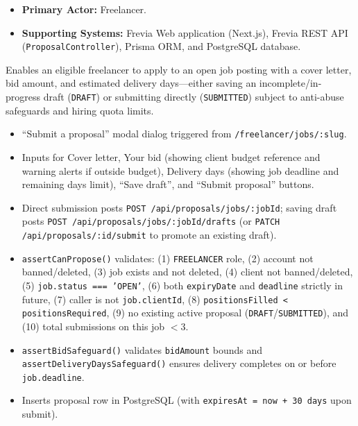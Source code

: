 
\begin{itemize}[leftmargin=1.6em,topsep=3pt,itemsep=2pt,parsep=0pt,label=$\bullet$]
    \item \textbf{Primary Actor:} Freelancer.
    \item \textbf{Supporting Systems:} Frevia Web application (Next.js), Frevia REST API (\texttt{ProposalController}), Prisma ORM, and PostgreSQL database.
\end{itemize}

\noindent Enables an eligible freelancer to apply to an open job posting with a cover letter, bid amount, and estimated delivery days—either saving an incomplete/in-progress draft (\texttt{DRAFT}) or submitting directly (\texttt{SUBMITTED}) subject to anti-abuse safeguards and hiring quota limits.

\begin{itemize}[leftmargin=1.6em,topsep=3pt,itemsep=2pt,parsep=0pt,label=$\bullet$]
    \item ``Submit a proposal'' modal dialog triggered from \texttt{/freelancer/jobs/:slug}.
    \item Inputs for Cover letter, Your bid (showing client budget reference and warning alerts if outside budget), Delivery days (showing job deadline and remaining days limit), ``Save draft'', and ``Submit proposal'' buttons.
\end{itemize}

\begin{itemize}[leftmargin=1.6em,topsep=3pt,itemsep=2pt,parsep=0pt,label=$\bullet$]
    \item Direct submission posts \texttt{POST /api/proposals/jobs/:jobId}; saving draft posts \texttt{POST /api/proposals/jobs/:jobId/drafts} (or \texttt{PATCH /api/proposals/:id/submit} to promote an existing draft).
    \item \texttt{assert\allowbreak{}Can\allowbreak{}Propose()} validates: (1) \texttt{FREELANCER} role, (2) account not banned/deleted, (3) job exists and not deleted, (4) client not banned/deleted, (5) \texttt{job.\allowbreak{}status =\allowbreak{}=\allowbreak{}= 'OPEN'}, (6) both \texttt{expiryDate} and \texttt{deadline} strictly in future, (7) caller is not \texttt{job.\allowbreak{}clientId}, (8) \texttt{positions\allowbreak{}Filled < positions\allowbreak{}Required}, (9) no existing active proposal (\texttt{DRAFT}/\texttt{SUBMITTED}), and (10) total submissions on this job $< 3$.
    \item \texttt{assert\allowbreak{}Bid\allowbreak{}Safeguard()} validates \texttt{bidAmount} bounds and \texttt{assert\allowbreak{}Delivery\allowbreak{}Days\allowbreak{}Safeguard()} ensures delivery completes on or before \texttt{job.\allowbreak{}deadline}.
    \item Inserts proposal row in PostgreSQL (with \texttt{expiresAt = now + 30 days} upon submit).
\end{itemize}

